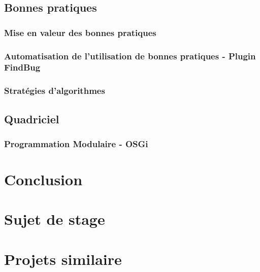 \documentclass[a4paper, 11pt]{report}
\begin{document}
\section{Bonnes pratiques}
\subsection{Mise en valeur des bonnes pratiques}
\subsection{Automatisation de l'utilisation de bonnes pratiques - Plugin FindBug}
\subsection{Stratégies d'algorithmes}

\section{Quadriciel}
\subsection{Programmation Modulaire - OSGi}
\chapter{Conclusion}

\appendix

\chapter{Sujet de stage}


\chapter{Projets similaire}

\listoffigures{}
\listoftables{}
\end{document}
